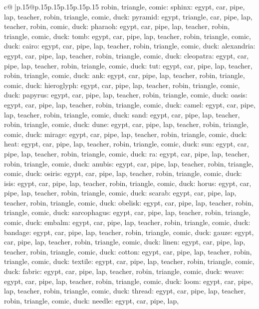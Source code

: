\documentclass{article}
\begin{document}
{\begin{supertabular}{c@{$\;$}|p{.15\linewidth}@{}p{.15\linewidth}p{.15\linewidth}p{.15\linewidth}p{.15\linewidth}p{.15\linewidth}}
{{{robin, triangle, comic\n\nCLUE: sphinx\nTARGETS: egypt, car, pipe, lap, teacher, robin, triangle, comic, duck\n\nCLUE: pyramid\nTARGETS: egypt, triangle, car, pipe, lap, teacher, robin, comic, duck\n\nCLUE: pharaoh\nTARGETS: egypt, car, pipe, lap, teacher, robin, triangle, comic, duck\n\nCLUE: tomb\nTARGETS: egypt, car, pipe, lap, teacher, robin, triangle, comic, duck\n\nCLUE: cairo\nTARGETS: egypt, car, pipe, lap, teacher, robin, triangle, comic, duck\n\nCLUE: alexandria\nTARGETS: egypt, car, pipe, lap, teacher, robin, triangle, comic, duck\n\nCLUE: cleopatra\nTARGETS: egypt, car, pipe, lap, teacher, robin, triangle, comic, duck\n\nCLUE: tut\nTARGETS: egypt, car, pipe, lap, teacher, robin, triangle, comic, duck\n\nCLUE: ank\nTARGETS: egypt, car, pipe, lap, teacher, robin, triangle, comic, duck\n\nCLUE: hieroglyph\nTARGETS: egypt, car, pipe, lap, teacher, robin, triangle, comic, duck\n\nCLUE: papyrus\nTARGETS: egypt, car, pipe, lap, teacher, robin, triangle, comic, duck\n\nCLUE: oasis\nTARGETS: egypt, car, pipe, lap, teacher, robin, triangle, comic, duck\n\nCLUE: camel\nTARGETS: egypt, car, pipe, lap, teacher, robin, triangle, comic, duck\n\nCLUE: sand\nTARGETS: egypt, car, pipe, lap, teacher, robin, triangle, comic, duck\n\nCLUE: dune\nTARGETS: egypt, car, pipe, lap, teacher, robin, triangle, comic, duck\n\nCLUE: mirage\nTARGETS: egypt, car, pipe, lap, teacher, robin, triangle, comic, duck\n\nCLUE: heat\nTARGETS: egypt, car, pipe, lap, teacher, robin, triangle, comic, duck\n\nCLUE: sun\nTARGETS: egypt, car, pipe, lap, teacher, robin, triangle, comic, duck\n\nCLUE: ra\nTARGETS: egypt, car, pipe, lap, teacher, robin, triangle, comic, duck\n\nCLUE: anubis\nTARGETS: egypt, car, pipe, lap, teacher, robin, triangle, comic, duck\n\nCLUE: osiris\nTARGETS: egypt, car, pipe, lap, teacher, robin, triangle, comic, duck\n\nCLUE: isis\nTARGETS: egypt, car, pipe, lap, teacher, robin, triangle, comic, duck\n\nCLUE: horus\nTARGETS: egypt, car, pipe, lap, teacher, robin, triangle, comic, duck\n\nCLUE: scarab\nTARGETS: egypt, car, pipe, lap, teacher, robin, triangle, comic, duck\n\nCLUE: obelisk\nTARGETS: egypt, car, pipe, lap, teacher, robin, triangle, comic, duck\n\nCLUE: sarcophagus\nTARGETS: egypt, car, pipe, lap, teacher, robin, triangle, comic, duck\n\nCLUE: embalm\nTARGETS: egypt, car, pipe, lap, teacher, robin, triangle, comic, duck\n\nCLUE: bandage\nTARGETS: egypt, car, pipe, lap, teacher, robin, triangle, comic, duck\n\nCLUE: gauze\nTARGETS: egypt, car, pipe, lap, teacher, robin, triangle, comic, duck\n\nCLUE: linen\nTARGETS: egypt, car, pipe, lap, teacher, robin, triangle, comic, duck\n\nCLUE: cotton\nTARGETS: egypt, car, pipe, lap, teacher, robin, triangle, comic, duck\n\nCLUE: textile\nTARGETS: egypt, car, pipe, lap, teacher, robin, triangle, comic, duck\n\nCLUE: fabric\nTARGETS: egypt, car, pipe, lap, teacher, robin, triangle, comic, duck\n\nCLUE: weave\nTARGETS: egypt, car, pipe, lap, teacher, robin, triangle, comic, duck\n\nCLUE: loom\nTARGETS: egypt, car, pipe, lap, teacher, robin, triangle, comic, duck\n\nCLUE: thread\nTARGETS: egypt, car, pipe, lap, teacher, robin, triangle, comic, duck\n\nCLUE: needle\nTARGETS: egypt, car, pipe, lap, }}}
\end{supertabular}}
\end{document}
